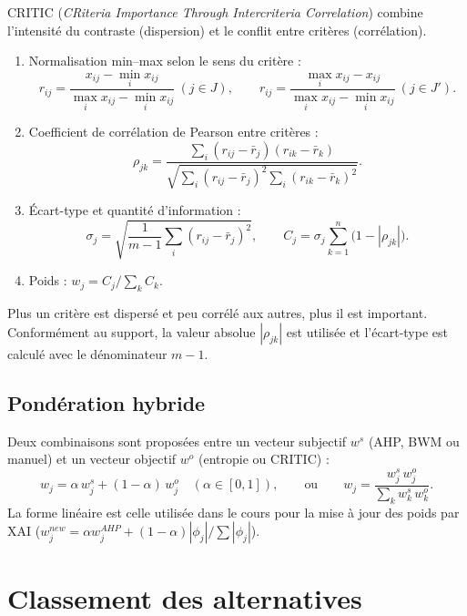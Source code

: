 \documentclass[11pt,a4paper]{report}
\theoremstyle{definition}
\theoremstyle{remark}
\begin{document}
CRITIC (\emph{CRiteria Importance Through Intercriteria Correlation}) combine l'intensité du contraste
(dispersion) et le conflit entre critères (corrélation).
\begin{enumerate}
  \item Normalisation min--max selon le sens du critère :
  \begin{equation}
    r_{ij}=\frac{x_{ij}-\min_i x_{ij}}{\max_i x_{ij}-\min_i x_{ij}}\ (j\in J),\qquad
    r_{ij}=\frac{\max_i x_{ij}-x_{ij}}{\max_i x_{ij}-\min_i x_{ij}}\ (j\in J').
  \end{equation}
  \item Coefficient de corrélation de Pearson entre critères :
  \begin{equation}
    \rho_{jk}=\frac{\sum_i (r_{ij}-\bar r_j)(r_{ik}-\bar r_k)}
                   {\sqrt{\sum_i (r_{ij}-\bar r_j)^2\sum_i (r_{ik}-\bar r_k)^2}}.
  \end{equation}
  \item Écart-type et quantité d'information :
  \begin{equation}
    \sigma_j=\sqrt{\frac{1}{m-1}\sum_i (r_{ij}-\bar r_j)^2},\qquad
    C_j=\sigma_j\sum_{k=1}^n\bigl(1-|\rho_{jk}|\bigr).
  \end{equation}
  \item Poids : $w_j=C_j/\sum_k C_k$.
\end{enumerate}
Plus un critère est dispersé et peu corrélé aux autres, plus il est important. Conformément au support, la
valeur absolue $|\rho_{jk}|$ est utilisée et l'écart-type est calculé avec le dénominateur $m-1$.

\section{Pondération hybride}

Deux combinaisons sont proposées entre un vecteur subjectif $w^{s}$ (AHP, BWM ou manuel) et un vecteur
objectif $w^{o}$ (entropie ou CRITIC) :
\begin{equation}
  w_j=\alpha\,w_j^{s}+(1-\alpha)\,w_j^{o}\quad(\alpha\in[0,1]),\qquad\text{ou}\qquad
  w_j=\frac{w_j^{s}\,w_j^{o}}{\sum_k w_k^{s}\,w_k^{o}}.
\end{equation}
La forme linéaire est celle utilisée dans le cours pour la mise à jour des poids par XAI
($w_j^{new}=\alpha w_j^{AHP}+(1-\alpha)|\phi_j|/\sum|\phi_j|$).

\chapter{Classement des alternatives}\label{ch:classement}
\end{document}
